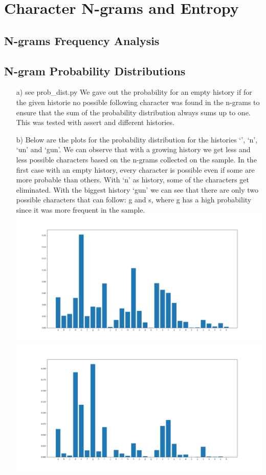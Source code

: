 \documentclass{article}
\begin{document}
\section{Character N-grams and Entropy}
\subsection{N-grams Frequency Analysis}
\subsection{N-gram Probability Distributions}
\begin{itemize}
	\item[a)]
	see prob\_dist.py
    We gave out the probability for an empty history if for the given historie no possible following character was found in the n-grams to ensure that the sum of the probability distribution always sums up to one. This was tested with assert and different histories.
    \item[b)]Below are the plots for the probability distribution for the histories `', `n', `un' and `gun'. We can observe that with a growing history we get less and less possible characters based on the n-grams collected on the sample. In the first case with an empty history, every character is possible even if some are more probable than others. With `n' as history, some of the characters get eliminated. With the biggest history `gun' we can see that there are only two possible characters that can follow: g and s, where g has a high probability since it was more frequent in the sample.
    \includegraphics[width=\textwidth]{./plots/emptyhistory.png}
	\includegraphics[width=\textwidth]{./plots/nhistory.png}

\end{itemize}
\end{document}
